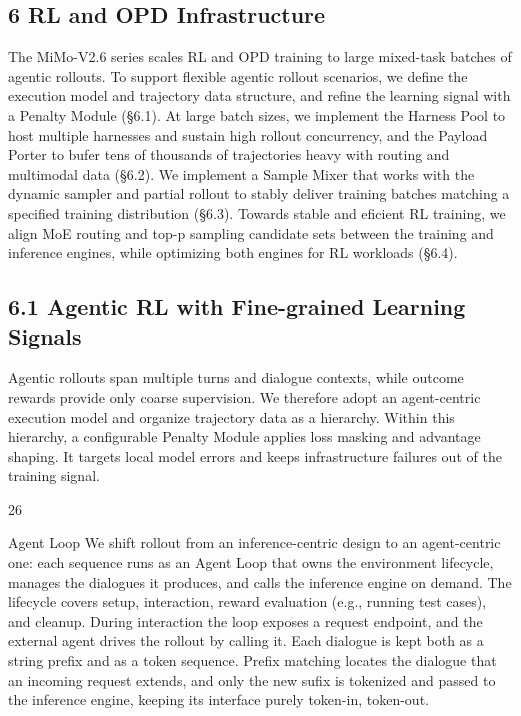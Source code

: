 \documentclass[
  10
]{article}
\begin{document}
\subsection{6 RL and OPD
Infrastructure}\label{rl-and-opd-infrastructure}

The MiMo-V2.6 series scales RL and OPD training to large mixed-task
batches of agentic rollouts. To support flexible agentic rollout
scenarios, we define the execution model and trajectory data structure,
and refine the learning signal with a Penalty Module (§6.1). At large
batch sizes, we implement the Harness Pool to host multiple harnesses
and sustain high rollout concurrency, and the Payload Porter to bufer
tens of thousands of trajectories heavy with routing and multimodal data
(§6.2). We implement a Sample Mixer that works with the dynamic sampler
and partial rollout to stably deliver training batches matching a
specified training distribution (§6.3). Towards stable and eficient RL
training, we align MoE routing and top-p sampling candidate sets between
the training and inference engines, while optimizing both engines for RL
workloads (§6.4).

\subsection{6.1 Agentic RL with Fine-grained Learning
Signals}\label{agentic-rl-with-fine-grained-learning-signals}

Agentic rollouts span multiple turns and dialogue contexts, while
outcome rewards provide only coarse supervision. We therefore adopt an
agent-centric execution model and organize trajectory data as a
hierarchy. Within this hierarchy, a configurable Penalty Module applies
loss masking and advantage shaping. It targets local model errors and
keeps infrastructure failures out of the training signal.

26

Agent Loop We shift rollout from an inference-centric design to an
agent-centric one: each sequence runs as an Agent Loop that owns the
environment lifecycle, manages the dialogues it produces, and calls the
inference engine on demand. The lifecycle covers setup, interaction,
reward evaluation (e.g., running test cases), and cleanup. During
interaction the loop exposes a request endpoint, and the external agent
drives the rollout by calling it. Each dialogue is kept both as a string
prefix and as a token sequence. Prefix matching locates the dialogue
that an incoming request extends, and only the new sufix is tokenized
and passed to the inference engine, keeping its interface purely
token-in, token-out.
\end{document}
